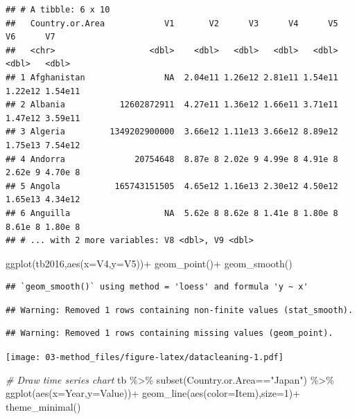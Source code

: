 \documentclass[
]{book}
\newenvironment{Shaded}{\begin{snugshade}}{\end{snugshade}}
\newcommand{\AttributeTok}[1]{\textcolor[rgb]{0.77,0.63,0.00}{#1}}
\newcommand{\CommentTok}[1]{\textcolor[rgb]{0.56,0.35,0.01}{\textit{#1}}}
\newcommand{\DecValTok}[1]{\textcolor[rgb]{0.00,0.00,0.81}{#1}}
\newcommand{\FunctionTok}[1]{\textcolor[rgb]{0.00,0.00,0.00}{#1}}
\newcommand{\NormalTok}[1]{#1}
\newcommand{\SpecialCharTok}[1]{\textcolor[rgb]{0.00,0.00,0.00}{#1}}
\newcommand{\StringTok}[1]{\textcolor[rgb]{0.31,0.60,0.02}{#1}}
\begin{document}
\begin{verbatim}
## # A tibble: 6 x 10
##   Country.or.Area            V1       V2      V3      V4      V5      V6      V7
##   <chr>                   <dbl>    <dbl>   <dbl>   <dbl>   <dbl>   <dbl>   <dbl>
## 1 Afghanistan                NA  2.04e11 1.26e12 2.81e11 1.54e11 1.22e12 1.54e11
## 2 Albania           12602872911  4.27e11 1.36e12 1.66e11 3.71e11 1.47e12 3.59e11
## 3 Algeria         1349202900000  3.66e12 1.11e13 3.66e12 8.89e12 1.75e13 7.54e12
## 4 Andorra              20754648  8.87e 8 2.02e 9 4.99e 8 4.91e 8 2.62e 9 4.70e 8
## 5 Angola           165743151505  4.65e12 1.16e13 2.30e12 4.50e12 1.65e13 4.34e12
## 6 Anguilla                   NA  5.62e 8 8.62e 8 1.41e 8 1.80e 8 8.61e 8 1.80e 8
## # ... with 2 more variables: V8 <dbl>, V9 <dbl>
\end{verbatim}

\begin{Shaded}
\begin{Highlighting}[]
\FunctionTok{ggplot}\NormalTok{(tb2016,}\FunctionTok{aes}\NormalTok{(}\AttributeTok{x=}\NormalTok{V4,}\AttributeTok{y=}\NormalTok{V5))}\SpecialCharTok{+}
  \FunctionTok{geom\_point}\NormalTok{()}\SpecialCharTok{+}
  \FunctionTok{geom\_smooth}\NormalTok{()}
\end{Highlighting}
\end{Shaded}

\begin{verbatim}
## `geom_smooth()` using method = 'loess' and formula 'y ~ x'
\end{verbatim}

\begin{verbatim}
## Warning: Removed 1 rows containing non-finite values (stat_smooth).
\end{verbatim}

\begin{verbatim}
## Warning: Removed 1 rows containing missing values (geom_point).
\end{verbatim}

\texttt{[image: 03-method\_files/figure-latex/datacleaning-1.pdf]}

\begin{Shaded}
\begin{Highlighting}[]
\CommentTok{\# Draw time series chart}
\NormalTok{tb }\SpecialCharTok{\%\textgreater{}\%} \FunctionTok{subset}\NormalTok{(Country.or.Area}\SpecialCharTok{==}\StringTok{"Japan"}\NormalTok{) }\SpecialCharTok{\%\textgreater{}\%}
  \FunctionTok{ggplot}\NormalTok{(}\FunctionTok{aes}\NormalTok{(}\AttributeTok{x=}\NormalTok{Year,}\AttributeTok{y=}\NormalTok{Value))}\SpecialCharTok{+}
    \FunctionTok{geom\_line}\NormalTok{(}\FunctionTok{aes}\NormalTok{(}\AttributeTok{color=}\NormalTok{Item),}\AttributeTok{size=}\DecValTok{1}\NormalTok{)}\SpecialCharTok{+}
    \FunctionTok{theme\_minimal}\NormalTok{()}
\end{Highlighting}
\end{Shaded}
\end{document}
